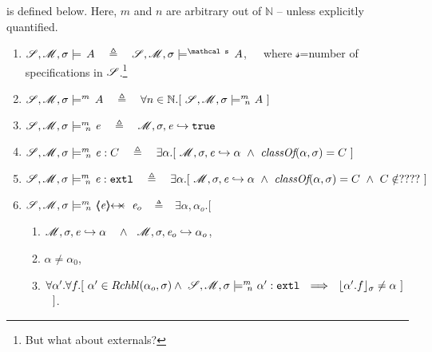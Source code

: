 \begin{definition} 
\label{def:chainmail-semantics}
\label{def:chainmail-protection-from}
\label{sect:semantics:assert:prtFrom}
 \label{def:chainmail-protection}
is defined below. Here, $m$ and $n$ are arbitrary out of $\mathbb N$ -- unless explicitly quantified.

\begin{enumerate}
\item
\label{sat}
$\sat \sigma  A \ \ \ \triangleq \ \ \   \satM  \sigma {\mathcal s}  A $,\ \ \  where ${\mathcal s}$=number of specifications in ${\mathcal{S}}$.\footnote{But what about externals?}
\item
\label{satM}
${{\mathcal{S}}, {\mathcal M}, \sigma \models^{m} \, A} \ \ \ \triangleq \ \ \  \forall n\in \mathbb{N}. [\ {\mathcal{S}}, {\mathcal M}, \sigma \models^{m} \!\!\!\!_{n} \ {A}\ ]$
\item
\label{cExpr}
$\satMN \sigma m n {{\re}}\ \ \ \triangleq \ \ \   \eval{\Mod}{\sigma}{{\re}}{\true}$  
\item
\label{cClass}
$\satMN \sigma m n {\re : C}\ \ \ \triangleq \ \ \   \exists \alpha.[\ \eval{\Mod}{\sigma}{{\re}}{\alpha}\   \wedge \ \class{\alpha} {\sigma}= C\ ]$  
\item
\label{cExternal}
$\satMN \sigma m n {\external \re}\ \ \ \triangleq \ \ \  \exists \alpha.[\ \eval{\Mod}{\sigma} {\re} {\alpha}\   \wedge \ \class{\alpha} {\sigma}= C  \ \wedge \ C \notin ???? \ ]$ 
 \item
 \label{cProtected}
$\satMN \sigma m n {\protectedFrom \re  {\re_o}}$ $\ \  \triangleq\ \ $ 
$\exists \alpha, \alpha_{o}. [$ 
  \begin{enumerate}
 \item
 $ \eval{\Mod}{\sigma}{{\re}}{\alpha}\ \ \ \wedge\ \ \eval{\Mod}{\sigma}{{\re_o}}{\alpha_o}$,
  \item
$\alpha\neq \alpha_0$,
 \item
$\forall \alpha'.\forall f.[\ \alpha' \in {\ensuremath{Rchbl(\alpha_o,\sigma)}} \wedge\   {\mathcal{S}}, {\mathcal M}, \sigma \models^{m} \!\!\!\!_{n} \ {\alpha':\mbox{\normalfont{\texttt{extl}}}} 
\ \ \Longrightarrow \ \  
  \lfloor \alpha'.f \rfloor_{\sigma} \neq \alpha     \ ] $  $  \strut \hspace{.25cm} ] $.
\end{enumerate}


\end{enumerate}
\end{definition}
